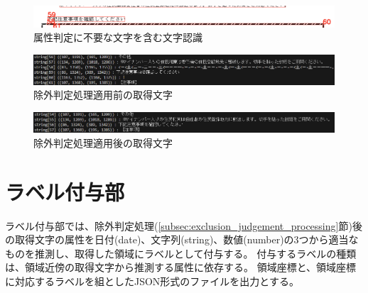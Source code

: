 \begin{figure}[t]
    \begin{center}
        \includegraphics[width=15cm]{image/04-implementation/before_exclusion_bbox.png}
        \caption{属性判定に不要な文字を含む文字認識}
        \label{fig:before_exclusion_bbox}
    \end{center}
\end{figure}

\begin{figure}[t]
    \begin{center}
        \includegraphics[width=15cm]{image/04-implementation/before_exclusion_string.png}
        \caption{除外判定処理適用前の取得文字}
        \label{fig:before_exclusion_string}
    \end{center}
\end{figure}

\begin{figure}[t]
    \begin{center}
        \includegraphics[width=15cm]{image/04-implementation/after_exclusion_string.png}
        \caption{除外判定処理適用後の取得文字}
        \label{fig:after_exclusion_string}
    \end{center}
\end{figure}


\section{ラベル付与部}\label{sec:label_link_part}
ラベル付与部では、除外判定処理(\ref{subsec:exclusion_judgement_processing}節)後の取得文字の属性を日付(date)、文字列(string)、数値(number)の3つから適当なものを推測し、取得した領域にラベルとして付与する。
付与するラベルの種類は、領域近傍の取得文字から推測する属性に依存する。
領域座標と、領域座標に対応するラベルを組としたJSON形式のファイルを出力とする。


